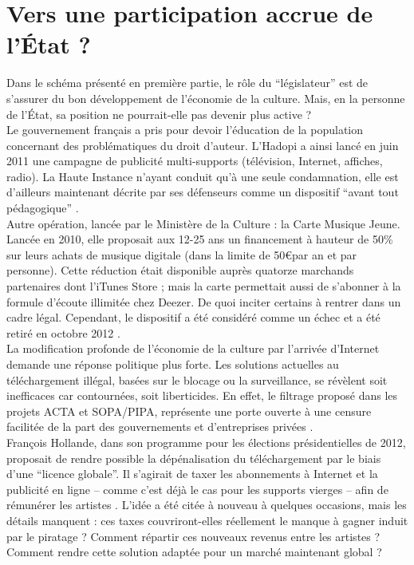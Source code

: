 \documentclass[a4paper]{report}
\begin{document}
	\section{Vers une participation accrue de l'État ?}
	Dans le schéma présenté en première partie, le rôle du ``législateur'' est de s'assurer du bon développement de l'économie de la culture. Mais, en la personne de l'État, sa position ne pourrait-elle pas devenir plus active ?\\

	Le gouvernement français a pris pour devoir l'éducation de la population concernant des problématiques du droit d'auteur. L'Hadopi a ainsi lancé en juin 2011 une campagne de publicité multi-supports (télévision, Internet, affiches, radio). La Haute Instance n'ayant conduit qu'à une seule condamnation, elle est d'ailleurs maintenant décrite par ses défenseurs comme un dispositif ``avant tout pédagogique'' \cite{podcast-industrie-musicale}.\\

	Autre opération, lancée par le Ministère de la Culture : la Carte Musique Jeune. Lancée en 2010, elle proposait aux 12-25 ans un financement à hauteur de 50\% sur leurs achats de musique digitale (dans la limite de 50\euro par an et par personne). Cette réduction était disponible auprès quatorze marchands partenaires dont l'iTunes Store ; mais la carte permettait aussi de s'abonner à la formule d'écoute illimitée chez Deezer. De quoi inciter certains à rentrer dans un cadre légal. Cependant, le dispositif a été considéré comme un échec \cite{carte-musique-jeune-echec} et a été retiré en octobre 2012 \cite{carte-musique-jeune-arret}.\\

	La modification profonde de l'économie de la culture par l'arrivée d'Internet demande une réponse politique plus forte. Les solutions actuelles au téléchargement illégal, basées sur le blocage ou la surveillance, se révèlent soit inefficaces car contournées, soit liberticides. En effet, le filtrage proposé dans les projets ACTA et SOPA/PIPA, représente une porte ouverte à une censure facilitée de la part des gouvernements et d'entreprises privées \cite{quadrature-filtrage}.\\

	François Hollande, dans son programme pour les élections présidentielles de 2012, proposait de rendre possible la dépénalisation du téléchargement par le biais d'une ``licence globale''. Il s'agirait de taxer les abonnements à Internet et la publicité en ligne – comme c'est déjà le cas pour les supports vierges – afin de rémunérer les artistes \cite{licence-globale}. L'idée a été citée à nouveau à quelques occasions, mais les détails manquent : ces taxes couvriront-elles réellement le manque à gagner induit par le piratage ? Comment répartir ces nouveaux revenus entre les artistes ? Comment rendre cette solution adaptée pour un marché maintenant global ?\\
\end{document}
